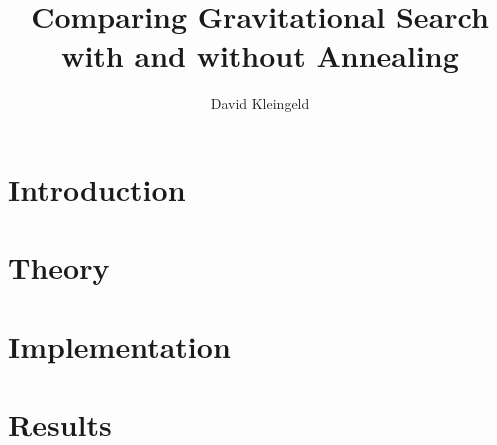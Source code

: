 \documentclass[lang=en, hanging-titles=true]{skrapport}
\title{Comparing Gravitational Search with and without Annealing}
\author[dskleingeld@gmail.com]{David Kleingeld}
\begin{document}
\maketitle
\tableofcontents

\section{Introduction}

\section{Theory}

\section{Implementation}

\section{Results}

%

\clearpage
\appendix
%
\printbibliography
\end{document}
